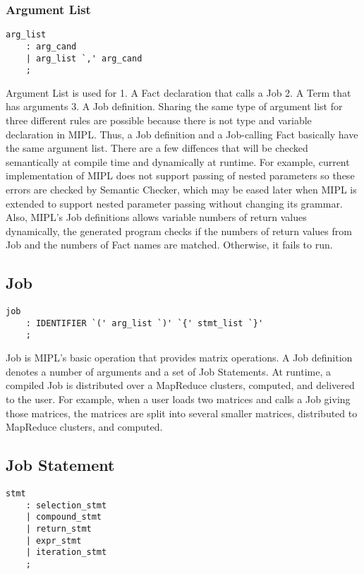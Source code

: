 \documentclass[prodmode,acmtecs]{acmsmall}
\begin{document}
\subsubsection{Argument List}
\begin{lstlisting}
arg_list
	: arg_cand
	| arg_list `,' arg_cand
	;
\end{lstlisting}

Argument List is used for 1. A Fact declaration that calls a Job
2. A Term that has arguments 3. A Job definition.  Sharing the
same type of argument list for three different rules are possible
because there is not type and variable declaration in MIPL.  Thus,
a Job definition and a Job-calling Fact basically have the same
argument list.  There are a few diffences that will be checked
semantically at compile time and dynamically at runtime.  For example,
current implementation of MIPL does not support passing of nested
parameters so these errors are checked by Semantic Checker, which may
be eased later when MIPL is extended to support nested parameter passing
without changing its grammar.  Also, MIPL's Job definitions allows
variable numbers of return values dynamically, the generated program
checks if the numbers of return values from Job and the numbers of
Fact names are matched.  Otherwise, it fails to run.

\subsection{Job}

\begin{lstlisting}
job
	: IDENTIFIER `(' arg_list `)' `{' stmt_list `}'
	;
\end{lstlisting}

\label{Job_Section}
Job is MIPL's basic operation that provides matrix operations.
A Job definition denotes a number of arguments and a set of Job
Statements.  At runtime, a compiled Job is distributed over
a MapReduce clusters, computed, and delivered to the user. For
example, when a user loads two matrices and calls a Job giving those
matrices, the matrices are split into several smaller matrices,
distributed to MapReduce clusters, and computed.


\subsection{Job Statement}

\begin{lstlisting}
stmt
	: selection_stmt
	| compound_stmt
	| return_stmt
	| expr_stmt
	| iteration_stmt
	;
\end{lstlisting}
\end{document}

